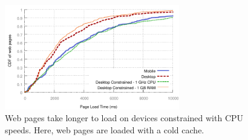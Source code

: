 \begin{figure}[t]
    \includegraphics[width=3in]{../graphs/plt_comparison/plt_differences.pdf}
    \caption[]{\label{fig:plt_differences}Web pages take longer to load on devices constrained with CPU speeds. Here, web pages are loaded with a cold cache.}
\end{figure}